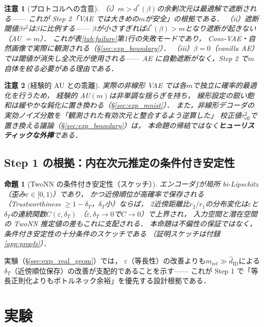 \documentclass[11pt,a4paper]{jsarticle}
\newtheorem{proposition}{命題}
\newtheorem{remark}{注意}
\newcommand{\hatdID}{\hat{d}_{\mathrm{ID}}}
\newcommand{\dstar}{d^{*}(\beta)}
\begin{document}
\begin{remark}[プロトコルへの含意]\label{rem:implication}
（i）$m > \dstar$の余剰次元は最適解で遮断される——
これが Step 2「VAE では大きめの$m$が安全」の根拠である．
（ii）遮断閾値$\beta\tau^2$は$\beta$に比例する——
$\beta$が小さすぎれば$\dstar > m$となり遮断が起きない（AU $= m$）．
これが表\ref{tab:failure}第1行の失敗モードであり，
Conv-VAE・自然画像で実際に観測される（§\ref{sec:exp_boundary}）．
（iii）$\beta = 0$（vanilla AE）では閾値が消失し全次元が使用される——
AE に自動遮断がなく，Step 2 で$m$自体を絞る必要がある理由である．
\end{remark}

\begin{remark}[経験的 AU との乖離]
実際の非線形 VAE では各$m$で独立に確率的最適化を行うため，
経験的 AU$(m)$は非単調な揺らぎを持ち，
線形設定の鋭い飽和は緩やかな鈍化に置き換わる（§\ref{sec:exp_mnist}）．
また，非線形デコーダの実効ノイズ分散を「観測された有効次元と整合するよう逆算した」
校正値$\tau^2_{\mathrm{eff}}$で置き換える議論（§\ref{sec:exp_boundary}）は，
本命題の帰結ではなく\textbf{ヒューリスティックな外挿}である．
\end{remark}

\subsection{Step 1 の根拠：内在次元推定の条件付き安定性}\label{sec:theory_twonn}

\begin{proposition}[TwoNN の条件付き安定性（スケッチ）]\label{thm:twonn_stability}
エンコーダ$f$が局所 bi-Lipschitz（歪み$\varepsilon \in [0,1)$）であり，
かつ近傍順位が高確率で保存される（Trustworthiness $\geq 1 - \delta_T$，$\delta_T$小）ならば，
2近傍距離比$r_2/r_1$の分布変化は$\varepsilon$と$\delta_T$の連続関数$C(\varepsilon, \delta_T)$
（$\varepsilon, \delta_T \to 0$で$C \to 0$）で上界され，
入力空間と潜在空間の TwoNN 推定値の差もこれに支配される．
本命題は不偏性の保証ではなく，条件付き安定性の十分条件のスケッチである
（証明スケッチは付録\ref{app:proofs}）．
\end{proposition}

実験（§\ref{sec:exp_real_geom}）では，
$\varepsilon$（等長性）の改善よりも$m_{\mathrm{ref}} \gg \hatdID$による
$\delta_T$（近傍順位保存）の改善が支配的であることを示す——
これが Step 1 で「等長正則化よりもボトルネック余裕」を優先する設計根拠である．

\section{実験}\label{sec:exp}
\end{document}
